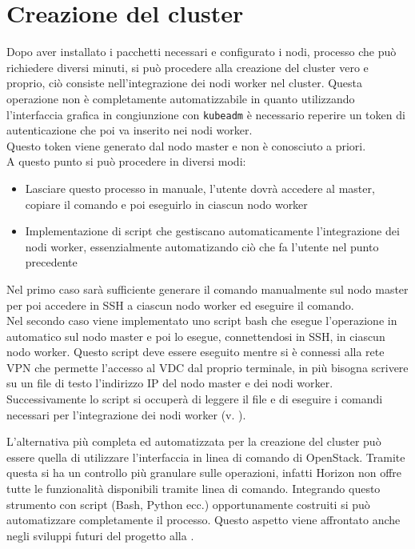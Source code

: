 \documentclass[12pt,a4paper,openright,twoside]{book}
\begin{document}
\section{Creazione del cluster}
\label{sec:cluster-creation}
Dopo aver installato i pacchetti necessari e configurato i nodi, processo che può richiedere diversi minuti, si può procedere alla creazione del cluster vero e proprio,
ciò consiste nell'integrazione dei nodi worker nel cluster. Questa operazione non è completamente automatizzabile in quanto utilizzando
l'interfaccia grafica in congiunzione con \texttt{kubeadm} è necessario reperire un token di autenticazione che poi va inserito nei nodi worker.\\
Questo token viene generato dal nodo master e non è conosciuto a priori.\\
A questo punto si può procedere in diversi modi:
\begin{itemize}
    \item Lasciare questo processo in manuale, l'utente dovrà accedere al master, copiare il comando e poi eseguirlo in ciascun nodo worker
    \item Implementazione di script che gestiscano automaticamente l'integrazione dei nodi worker, essenzialmente automatizando ciò che fa l'utente nel punto precedente
\end{itemize}
Nel primo caso sarà sufficiente generare il comando manualmente sul nodo master per poi accedere in SSH a ciascun nodo worker ed eseguire il comando.\\
Nel secondo caso viene implementato uno script bash che esegue l'operazione in automatico sul nodo master e poi lo esegue, connettendosi in SSH, in ciascun nodo worker. 
Questo script deve essere eseguito mentre si è connessi alla rete VPN che permette l'accesso al VDC dal proprio terminale, in più bisogna scrivere su un file di testo l'indirizzo IP del nodo master e dei nodi worker.
Successivamente lo script si occuperà di leggere il file e di eseguire i comandi necessari per l'integrazione dei nodi worker (v. ).


L'alternativa più completa ed automatizzata per la creazione del cluster può essere quella di utilizzare l'interfaccia in linea di comando di OpenStack.
Tramite questa si ha un controllo più granulare sulle operazioni, infatti Horizon non offre tutte le funzionalità disponibili tramite linea di comando.
Integrando questo strumento con script (Bash, Python ecc.) opportunamente costruiti si può automatizzare completamente il processo.
Questo aspetto viene affrontato anche negli sviluppi futuri del progetto alla .
\end{document}
